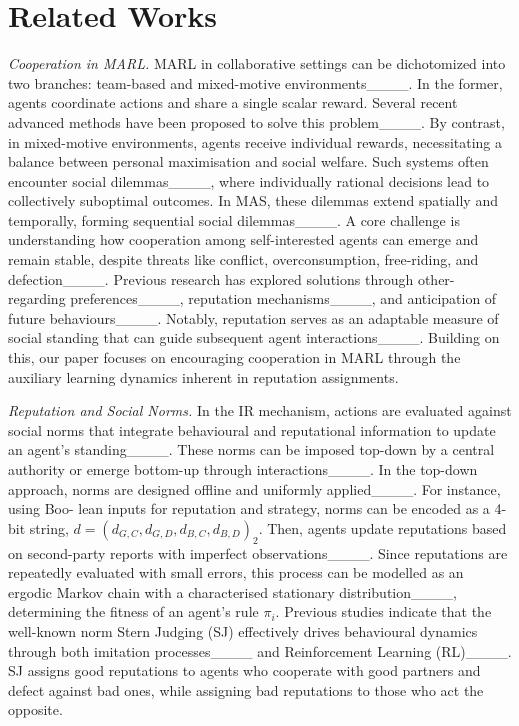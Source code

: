 \section{Related Works}
\textit{Cooperation in MARL.} MARL in collaborative settings can be dichotomized into two branches: team-based and mixed-motive environments____. In the former, agents coordinate actions and share a single scalar reward. Several recent advanced methods have been proposed to solve this problem____. By contrast, in mixed-motive environments, agents receive individual rewards, necessitating a balance between personal maximisation and social welfare. Such systems often encounter social dilemmas____, where individually rational decisions lead to collectively suboptimal outcomes. In MAS, these dilemmas extend spatially and temporally, forming sequential social dilemmas____. A core challenge is understanding how cooperation among self-interested agents can emerge and remain stable, despite threats like conflict, overconsumption, free-riding, and defection____. Previous research has explored solutions through other-regarding preferences____, reputation mechanisms____, and anticipation of future behaviours____. Notably, reputation serves as an adaptable measure of social standing that can guide subsequent agent interactions____. Building on this, our paper focuses on encouraging cooperation in MARL through the auxiliary learning dynamics inherent in reputation assignments.

\textit{Reputation and Social Norms.} In the IR mechanism, actions are evaluated against social norms that integrate behavioural and reputational information to update an agent's standing____. These norms can be imposed top-down by a central authority or emerge bottom-up through interactions____. In the top-down approach, norms are designed offline and uniformly applied____. For instance, using Boo- lean inputs for reputation and strategy, norms can be encoded as a 4-bit string, $d=(d_{G, C},d_{G, D},d_{B, C},d_{B, D})_2$. Then, agents update reputations based on second-party reports with imperfect observations____. Since reputations are repeatedly evaluated with small errors, this process can be modelled as an ergodic Markov chain with a characterised stationary distribution____, determining the fitness of an agent’s rule $\pi_i$. Previous studies indicate that the well-known norm Stern Judging (SJ) effectively drives behavioural dynamics through both imitation processes____ and Reinforcement Learning (RL)____. SJ assigns good reputations to agents who cooperate with good partners and defect against bad ones, while assigning bad reputations to those who act the opposite.

